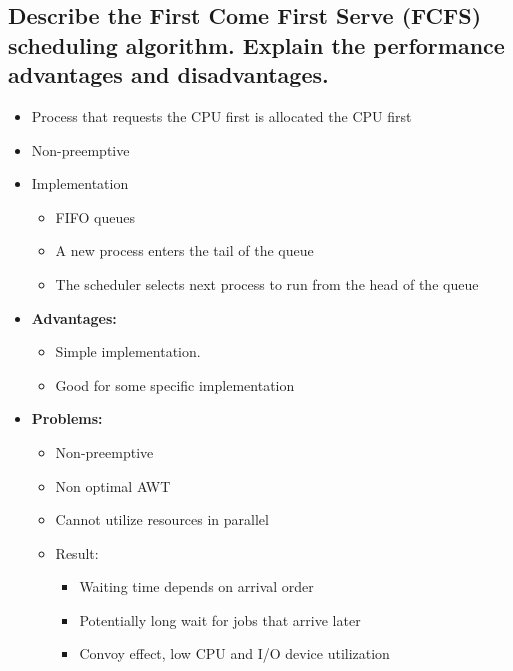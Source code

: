 \documentclass[a4paper]{article}
\begin{document}
\subsection{Describe the First Come First Serve (FCFS) scheduling algorithm. Explain the performance advantages and disadvantages.} %
\label{sub:Describe the First Come First Serve (FCFS) scheduling algorithm. Explain the performance advantages and disadvantages.}
\begin{itemize}
  \item Process that requests the CPU first is allocated the CPU first
  \item Non-preemptive
  \item Implementation
    \begin{itemize}
      \item FIFO queues
      \item A new process enters the tail of the queue
      \item The scheduler selects next process to run from the head of the queue
    \end{itemize}
  \item {\bf Advantages:}
    \begin{itemize}
      \item Simple implementation.
      \item Good for some specific implementation
    \end{itemize}
  \item {\bf Problems: }
    \begin{itemize}
      \item Non-preemptive
      \item Non optimal AWT
      \item Cannot utilize resources in parallel
      \item Result:
        \begin{itemize}
          \item Waiting time depends on arrival order
          \item Potentially long wait for jobs that arrive later
          \item Convoy effect, low CPU and I/O device utilization
        \end{itemize}
    \end{itemize}
\end{itemize}
\end{document}
